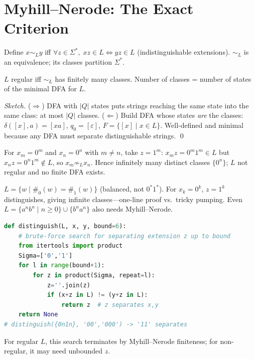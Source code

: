 \section{Myhill--Nerode: The Exact Criterion}
\label{sec:myhill-nerode}
Define $x\sim_L y$ iff $\forall z\in\Sigma^*,\;xz\in L\Leftrightarrow yz\in L$ (indistinguishable extensions). $\sim_L$ is an equivalence; its classes partition $\Sigma^*$.

\begin{theorem}
$L$ regular iff $\sim_L$ has finitely many classes. Number of classes = number of states of the minimal DFA for $L$.
\end{theorem}
\begin{proof}[Sketch]
($\Rightarrow$) DFA with $|Q|$ states puts strings reaching the same state into the same class: at most $|Q|$ classes. ($\Leftarrow$) Build DFA whose states \emph{are} the classes: $\delta([x],a)=[xa]$, $q_0=[\varepsilon]$, $F=\{[x]\mid x\in L\}$. Well-defined and minimal because any DFA must separate distinguishable strings. \qed
\end{proof}

\begin{example}
For $x_m=0^m$ and $x_n=0^n$ with $m\neq n$, take $z=1^m$: $x_mz=0^m1^m\in L$ but $x_nz=0^n1^m\notin L$, so $x_m\not\sim_L x_n$. Hence infinitely many distinct classes $\{0^n\}$; $L$ not regular and no finite DFA exists.
\end{example}

\begin{example}
$L=\{w\mid\#_0(w)=\#_1(w)\}$ (balanced, not $0^*1^*$). For $x_k=0^k$, $z=1^k$ distinguishes, giving infinite classes---one-line proof vs.\ tricky pumping. Even $L=\{a^nb^n\mid n\ge0\}\cup\{b^n a^n\}$ also needs Myhill--Nerode.
\end{example}

\begin{example}
\begin{lstlisting}[language=Python]
def distinguish(L, x, y, bound=6):
    # brute-force search for separating extension z up to bound
    from itertools import product
    Sigma=['0','1']
    for l in range(bound+1):
        for z in product(Sigma, repeat=l):
            z=''.join(z)
            if (x+z in L) != (y+z in L):
                return z  # z separates x,y
    return None
# distinguish({0n1n}, '00','000') -> '11' separates
\end{lstlisting}
For regular $L$, this search terminates by Myhill--Nerode finiteness; for non-regular, it may need unbounded $z$.
\end{example}

